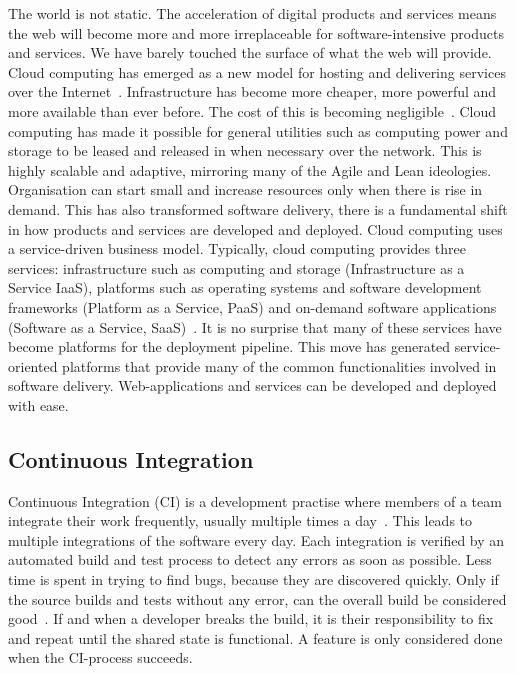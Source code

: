\documentclass[english]{tktltiki2}
\begin{document}
The world is not static. The acceleration of digital products and services means the web will become more and more irreplaceable for software-intensive products and services. We have barely touched the surface of what the web will provide. Cloud computing has emerged as a new model for hosting and delivering services over the Internet~\cite{ZCB10}. Infrastructure has become more cheaper, more powerful and more available than ever before. The cost of this is becoming negligible~\cite{ZCB10, Bos12}. Cloud computing has made it possible for general utilities such as computing power and storage to be leased and released in when necessary over the network. This is highly scalable and adaptive, mirroring many of the Agile and Lean ideologies. Organisation can start small and increase resources only when there is rise in demand. This has also transformed software delivery, there is a fundamental shift in how products and services are developed and deployed. Cloud computing uses a service-driven business model. Typically, cloud computing provides three services: infrastructure such as computing and storage (Infrastructure as a Service IaaS), platforms such as operating systems and software development frameworks (Platform as a Service, PaaS) and on-demand software applications (Software as a Service, SaaS)~\cite{ZCB10}. It is no surprise that many of these services have become platforms for the deployment pipeline. This move has generated service-oriented platforms that provide many of the common functionalities involved in software delivery. Web-applications and services can be developed and deployed with ease.

\subsection{Continuous Integration}

Continuous Integration (CI) is a development practise where members of a team integrate their work frequently, usually multiple times a day~\cite{Fow06}. This leads to multiple integrations of the software every day. Each integration is verified by an automated build and test process to detect any errors as soon as possible. Less time is spent in trying to find bugs, because they are discovered quickly. Only if the source builds and tests without any error, can the overall build be considered good~\cite{Fow06}. If and when a developer breaks the build, it is their responsibility to fix and repeat until the shared state is functional. A feature is only considered done when the CI-process succeeds.
\end{document}
